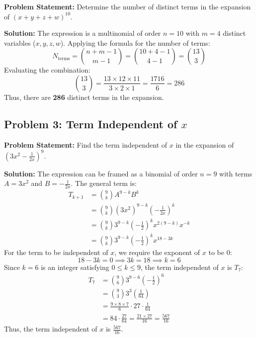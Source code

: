 \documentclass[10pt,journal,compsoc,onecolumn]{IEEEtran}
\begin{document}
\textbf{Problem Statement:}
Determine the number of distinct terms in the expansion of $(x + y + z + w)^{10}$.

\textbf{Solution:}
The expression is a multinomial of order $n = 10$ with $m = 4$ distinct variables ($x, y, z, w$).
Applying the formula for the number of terms:
\begin{equation}
N_{\text{terms}} = \binom{n + m - 1}{m - 1} = \binom{10 + 4 - 1}{4 - 1} = \binom{13}{3}
\end{equation}
Evaluating the combination:
\begin{equation}
\binom{13}{3} = \frac{13 \times 12 \times 11}{3 \times 2 \times 1} = \frac{1716}{6} = 286
\end{equation}
Thus, there are \textbf{286} distinct terms in the expansion.

\subsection{Problem 3: Term Independent of $x$}

\textbf{Problem Statement:}
Find the term independent of $x$ in the expansion of $\left(3x^2 - \frac{1}{2x}\right)^9$.

\textbf{Solution:}
The expression can be framed as a binomial of order $n = 9$ with terms $A = 3x^2$ and $B = -\frac{1}{2x}$.
The general term is:
\begin{align}
T_{k+1} &= \binom{9}{k} A^{9-k} B^k \\
&= \binom{9}{k} (3x^2)^{9-k} \left(-\frac{1}{2x}\right)^k \\
&= \binom{9}{k} 3^{9-k} \left(-\frac{1}{2}\right)^k x^{2(9-k)} x^{-k} \\
&= \binom{9}{k} 3^{9-k} \left(-\frac{1}{2}\right)^k x^{18 - 3k}
\end{align}
For the term to be independent of $x$, we require the exponent of $x$ to be $0$:
\begin{equation}
18 - 3k = 0 \implies 3k = 18 \implies k = 6
\end{equation}
Since $k = 6$ is an integer satisfying $0 \le k \le 9$, the term independent of $x$ is $T_7$:
\begin{align}
T_7 &= \binom{9}{6} 3^{9-6} \left(-\frac{1}{2}\right)^6 \\
&= \binom{9}{3} 3^3 \left(\frac{1}{64}\right) \\
&= \frac{9 \times 8 \times 7}{6} \cdot 27 \cdot \frac{1}{64} \\
&= 84 \cdot \frac{27}{64} = \frac{21 \times 27}{16} = \frac{567}{16}
\end{align}
Thus, the term independent of $x$ is \textbf{$\frac{567}{16}$}.
\end{document}
